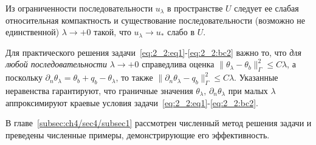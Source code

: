 \begin{remark}
    Из ограниченности последовательности $u_\lambda$
    в пространстве $U$ следует
    ее слабая относительная компактность и существование последовательности
    (возможно не единственной) $\lambda\to+0$ такой, что
    $u_\lambda \rightarrow u_*$ слабо в $U$.
\end{remark}

Для практического решения задачи~\eqref{eq:2_2:eq1}-\eqref{eq:2_2:bc2} важно то,
что \textit{для любой последовательности} $\lambda\to+0$ справедлива оценка
$\|\theta_\lambda -\theta_b\|^2_\Gamma\leq C\lambda$,
а поскольку $\partial_n\theta_\lambda=\theta_b+q_b-\theta_\lambda$,
то также $\|\partial_n\theta_\lambda-q_b\|^2_\Gamma\leq C\lambda$.
Указанные неравенства гарантируют, что граничные значения
$\theta_\lambda,\,\partial_n\theta_\lambda$ при малых $\lambda$
аппроксимируют краевые условия задачи~\eqref{eq:2_2:eq1}-\eqref{eq:2_2:bc2}.

В главе~\ref{subsec:ch4/sec4/subsec1} рассмотрен численный метод решения задачи
и преведены численные примеры, демонстрирующие его эффективность.




